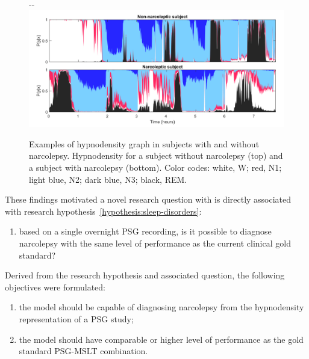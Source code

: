 \begin{figure}[t]
    \begin{adjustwidth*}{}{-\marginparwidth-\marginparsep}
        \includegraphics[width=\textwidth+\marginparwidth+\marginparsep]{figures/paper-iii/Figure_3.png}
        \caption[Examples of hypnodensity graphs.]{Examples of hypnodensity graph in subjects with and without narcolepsy. 
        Hypnodensity for a subject without narcolepsy (top) and a subject with narcolepsy (bottom). 
        Color codes: white, \ac{W}; red, \ac{N1}; light blue, \ac{N2}; dark blue, \ac{N3}; black, \ac{REM}.}
        \label{fig:paperiii-figure03}
    \end{adjustwidth*}
\end{figure}

These findings motivated a novel research question with is directly associated with research hypothesis~\ref{hypothesis:sleep-disorders}\graffito{\ref{hypothesis:sleep-disorders}: \hypothesis\xspace sleep disorders.}: 
\newcommand{\questionSleepDisorders}{based on a single overnight \ac{PSG} recording, is it possible to diagnose narcolepsy with the same level of performance as the current clinical gold standard?}
\begin{enumerate}[label={\footnotesize\bfseries\scshape RQ~3.\arabic*}, ref={\bfseries\scshape RQ~3.\arabic*}]
    \item \questionSleepDisorders\label{question:sleep-disorders}
\end{enumerate}

Derived from the research hypothesis and associated question, the following objectives were formulated:

\begin{enumerate}[label=(\roman*)]
    \item the model should be capable of diagnosing narcolepsy from the hypnodensity representation of a \ac{PSG} study;
    \item the model should have comparable or higher level of performance as the gold standard \ac{PSG}-\ac{MSLT} combination.
\end{enumerate}

